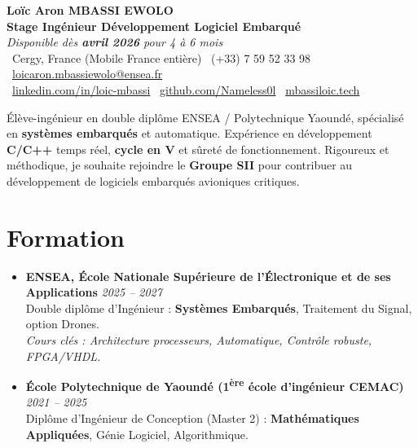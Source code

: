 \documentclass[a4paper,11pt]{article}
\begin{document}
\begin{center}
    {\Large \textbf{Loïc Aron MBASSI EWOLO}} \\ \vspace{4pt}
    \textbf{\large Stage Ingénieur Développement Logiciel Embarqué} \\
    \textit{\small Disponible dès \textbf{avril 2026} pour 4 à 6 mois} \\ \vspace{4pt}
    \small
    \faMapMarker\ Cergy, France (Mobile France entière) \quad
    \faPhone\ (+33) 7 59 52 33 98 \quad
    \faEnvelope\ \href{mailto:loicaron.mbassiewolo@ensea.fr}{loicaron.mbassiewolo@ensea.fr} \\ \vspace{2pt}
    \faLinkedin\ \href{https://www.linkedin.com/in/loic-mbassi/}{linkedin.com/in/loic-mbassi} \quad
    \faGithub\ \href{https://github.com/Nameless0l}{github.com/Nameless0l} \quad
    \faGlobe\ \href{https://mbassiloic.tech}{mbassiloic.tech}
\end{center}

\vspace{-6pt}

\noindent\small{Élève-ingénieur en double diplôme ENSEA / Polytechnique Yaoundé, spécialisé en \textbf{systèmes embarqués} et automatique. Expérience en développement \textbf{C/C++} temps réel, \textbf{cycle en V} et sûreté de fonctionnement. Rigoureux et méthodique, je souhaite rejoindre le \textbf{Groupe SII} pour contribuer au développement de logiciels embarqués avioniques critiques.}

\section{Formation}
\begin{itemize}[leftmargin=*, label=\tiny$\bullet$, nosep]
    \item \textbf{ENSEA, École Nationale Supérieure de l'Électronique et de ses Applications} \hfill \textit{2025 -- 2027} \\
    \small{Double diplôme d'Ingénieur : \textbf{Systèmes Embarqués}, Traitement du Signal, option Drones.} \\
    \textit{\small{Cours clés : Architecture processeurs, Automatique, Contrôle robuste, FPGA/VHDL.}}
    \item \textbf{École Polytechnique de Yaoundé (1\textsuperscript{ère} école d'ingénieur CEMAC)} \hfill \textit{2021 -- 2025} \\
    \small{Diplôme d'Ingénieur de Conception (Master 2) : \textbf{Mathématiques Appliquées}, Génie Logiciel, Algorithmique.}
\end{itemize}
\end{document}
